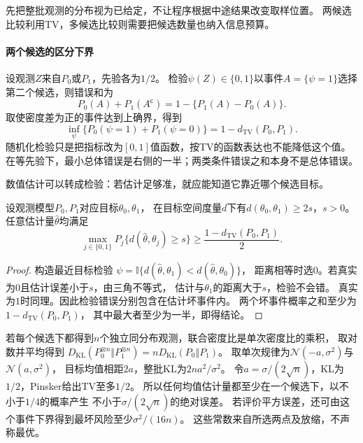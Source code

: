 先把整批观测的分布视为已给定，不让程序根据中途结果改变取样位置。
两候选比较利用TV，多候选比较则需要把候选数量也纳入信息预算。

\paragraph{两个候选的区分下界}
\label{sec:information-two-candidates}

设观测\(Z\)来自\(P_0\)或\(P_1\)，先验各为\(1/2\)。
检验\(\psi(Z)\in\{0,1\}\)以事件\(A=\{\psi=1\}\)选择第二个候选，则错误和为
\[
  P_0(A)+P_1(A^{\mathsf c})=1-\{P_1(A)-P_0(A)\}.
\]
取使密度差为正的事件达到上确界，得到
\begin{equation}
  \inf_\psi\{P_0(\psi=1)+P_1(\psi=0)\}
     =1-d_{\mathrm{TV}}(P_0,P_1).
  \label{eq:information-binary-testing-tv}
\end{equation}
随机化检验只是把指标改为\([0,1]\)值函数，按TV的函数表达也不能降低这个值。
在等先验下，最小总体错误是右侧的一半；两类条件错误之和本身不是总体错误。

数值估计可以转成检验：若估计足够准，就应能知道它靠近哪个候选目标。

\begin{theorem}[Le Cam两点下界]
\label{thm:information-le-cam}
设观测模型\(P_0,P_1\)对应目标\(\theta_0,\theta_1\)，
在目标空间度量\(d\)下有\(d(\theta_0,\theta_1)\geq2s\)，\(s>0\)。
任意估计量\(\widehat\theta\)均满足
\begin{equation}
  \max_{j\in\{0,1\}}P_j\{d(\widehat\theta,\theta_j)\geq s\}
  \geq\frac{1-d_{\mathrm{TV}}(P_0,P_1)}2.
  \label{eq:information-le-cam}
\end{equation}
\end{theorem}
\begin{proof}
构造最近目标检验
\(\psi=\mathbb I\{d(\widehat\theta,\theta_1)<d(\widehat\theta,\theta_0)\}\)，
距离相等时选\(0\)。若真实为\(0\)且估计误差小于\(s\)，由三角不等式，
估计与\(\theta_1\)的距离大于\(s\)，检验不会错。
真实为\(1\)时同理。因此检验错误分别包含在估计坏事件内。
两个坏事件概率之和至少为\(1-d_{\mathrm{TV}}(P_0,P_1)\)，
其中最大者至少为一半，即得结论。
\end{proof}

若每个候选下都得到\(n\)个独立同分布观测，联合密度比是单次密度比的乘积，
取对数并平均得到
\(D_{\mathrm{KL}}(P_0^{\otimes n}\Vert P_1^{\otimes n})
=nD_{\mathrm{KL}}(P_0\Vert P_1)\)。
取单次规律为\(\mathcal N(-a,\sigma^2)\)与\(\mathcal N(a,\sigma^2)\)，
目标均值相距\(2a\)，整批KL为\(2na^2/\sigma^2\)。
令\(a=\sigma/(2\sqrt n)\)，KL为\(1/2\)，Pinsker给出TV至多\(1/2\)。
所以任何均值估计量都至少在一个候选下，以不小于\(1/4\)的概率产生
不小于\(\sigma/(2\sqrt n)\)的绝对误差。
若评价平方误差，还可由这个事件下界得到最坏风险至少\(\sigma^2/(16n)\)。
这些常数来自所选两点及放缩，不声称最优。

